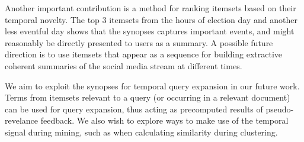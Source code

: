 \documentclass{sig-alternate}
\begin{document}
Another important contribution is a method for ranking itemsets based on their temporal novelty.
The top 3 itemsets from the hours of election day and another less eventful
day shows that the synopses captures important events, and might reasonably
be directly presented to users as a summary.
A possible future direction is to use itemsets that appear as a sequence for
building extractive coherent summaries of the social media stream at
different times.

We aim to exploit the synopses for temporal query expansion in our future work. Terms from itemsets relevant to a query (or occurring in a relevant document)
can be used for query expansion, thus acting as precomputed results of 
pseudo-revelance feedback.
We also wish to explore ways to make use of the temporal signal during mining,
such as when calculating similarity during clustering.

 





%
%
\end{document}
